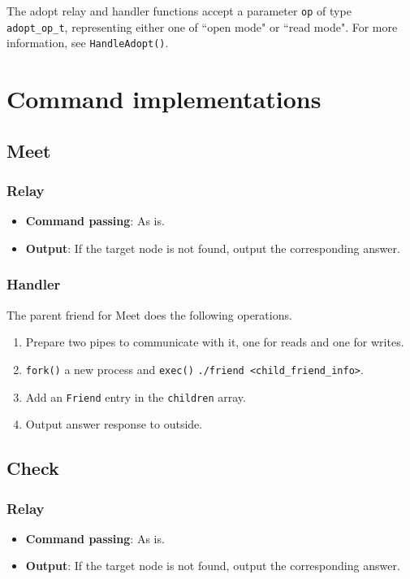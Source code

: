 \documentclass[12pt, a4paper]{article}
\begin{document}
  The adopt relay and handler functions accept a parameter \verb|op|
  of type \verb|adopt_op_t|, representing either one of ``open mode" or ``read
  mode". For more information, see \verb|HandleAdopt()|.

  \section{Command implementations}
  \subsection{Meet}
  \subsubsection{Relay}
  \begin{itemize}
    \item \textbf{Command passing}: As is.
    \item \textbf{Output}: If the target node is not found, output the corresponding answer.
  \end{itemize}

  \subsubsection{Handler}
  The parent friend for Meet does the following operations.
  \begin{enumerate}
    \item Prepare two pipes to communicate with it, one for reads and one for writes.
    \item \verb|fork()| a new process and \verb|exec()| \verb|./friend <child_friend_info>|.
    \item Add an \verb|Friend| entry in the \verb|children| array.
    \item Output answer response to outside.
  \end{enumerate}

  \subsection{Check}
  \subsubsection{Relay}
  \begin{itemize}
    \item \textbf{Command passing}: As is.
    \item \textbf{Output}: If the target node is not found, output the corresponding answer.
  \end{itemize}
\end{document}
